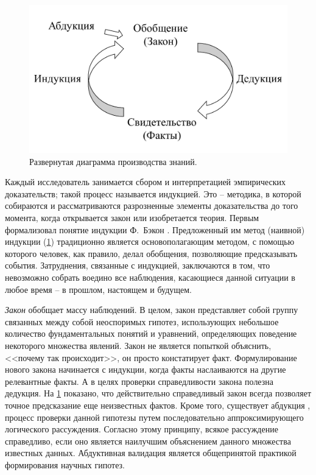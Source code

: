 \begin{figure}[ht]
    \centering
    \includegraphics[width=0.7\linewidth]{images/science_lifecycle}
    \caption{Развернутая диаграмма производства знаний.}\label{fig:knowledge_production}
\end{figure}

Каждый исследователь занимается сбором и интерпретацией эмпирических доказательств; такой процесс называется индукцией. 
Это – методика, в которой собираются и рассматриваются разрозненные элементы доказательства до того момента, когда 
открывается закон или изобретается теория. Первым формализовал понятие индукции Ф.~Бэкон \cite{Bacon2000}. 
Предложенный им метод (наивной) индукции (\cref{fig:knowledge_production}) традиционно является основополагающим 
методом, с помощью которого человек, как правило, делал обобщения, позволяющие предсказывать события. Затруднения, 
связанные с индукцией, заключаются в том, что невозможно собрать воедино все наблюдения, касающиеся данной ситуации 
в любое время – в прошлом, настоящем и будущем.  

\textit{Закон} обобщает массу наблюдений. В целом, закон представляет собой группу связанных между собой неоспоримых 
гипотез, использующих небольшое количество фундаментальных понятий и уравнений, определяющих поведение некоторого 
множества явлений. Закон не является попыткой объяснить, <<почему так происходит>>, он просто констатирует факт. 
Формулирование нового закона начинается с индукции, когда факты наслаиваются на другие релевантные факты. А в целях 
проверки справедливости закона полезна дедукция.  На \cref{fig:knowledge_production} показано, что действительно 
справедливый закон всегда позволяет точное предсказание еще неизвестных фактов.  Кроме того, существует абдукция 
\cite{Menzies1996}, процесс проверки данной гипотезы путем последовательно аппроксимирующего логического рассуждения. 
Согласно этому принципу, всякое рассуждение справедливо, если оно является наилучшим объяснением данного множества 
известных данных. Абдуктивная валидация является общепринятой практикой формирования научных гипотез.

